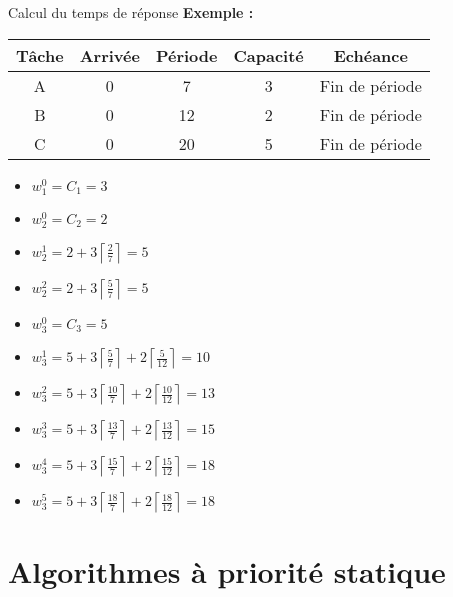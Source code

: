 \begin{frame}{Calcul du temps de réponse}
  \textbf{Exemple :}
    \begin{center}
      \begin{tabular}{ccccc}
        \hline
        Tâche & Arrivée & Période & Capacité & Echéance \\
        \hline
        A & 0 &  7 & 3 & Fin de période\\
        B & 0 & 12 & 2 & Fin de période\\
        C & 0 & 20 & 5 & Fin de période\\
        \hline
      \end{tabular}
    \end{center}
    \begin{itemize} 
      \item $w_1^0 = C_1 = 3$
      \item $w_2^0 = C_2 = 2$
      \item $w_2^1 = 2 + 3 \left\lceil\frac{2}{7}\right\rceil = 5$
      \item $w_2^2 = 2 + 3 \left\lceil\frac{5}{7}\right\rceil = 5$
      \item $w_3^0 = C_3 = 5$
      \item $w_3^1 = 5 + 3 \left\lceil\frac{5}{7}\right\rceil + 2 \left\lceil\frac{5}{12}\right\rceil = 10$
      \item $w_3^2 = 5 + 3 \left\lceil\frac{10}{7}\right\rceil + 2 \left\lceil\frac{10}{12}\right\rceil = 13$
      \item $w_3^3 = 5 + 3 \left\lceil\frac{13}{7}\right\rceil + 2 \left\lceil\frac{13}{12}\right\rceil = 15$
      \item $w_3^4 = 5 + 3 \left\lceil\frac{15}{7}\right\rceil + 2 \left\lceil\frac{15}{12}\right\rceil = 18$
      \item $w_3^5 = 5 + 3 \left\lceil\frac{18}{7}\right\rceil + 2 \left\lceil\frac{18}{12}\right\rceil = 18$
      \end{itemize} 
\end{frame}

\section{Algorithmes à priorité statique}

